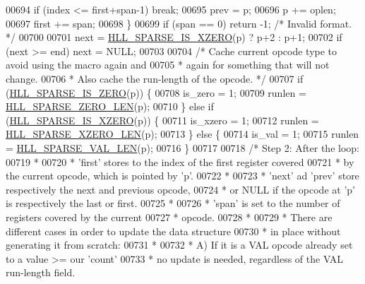 \begin{DoxyCode}
{{00694         \textcolor{keywordflow}{if} (index <= first+span-1) \textcolor{keywordflow}{break};
00695         prev = p;
00696         p += oplen;
00697         first += span;
00698     \}
00699     \textcolor{keywordflow}{if} (span == 0) \textcolor{keywordflow}{return} -1; \textcolor{comment}{/* Invalid format. */}
00700 
00701     next = \hyperlink{hyperloglog_8c_ac672e0af491e4cbfe7a5859ae4dc74f9}{HLL\_SPARSE\_IS\_XZERO}(p) ? p+2 : p+1;
00702     \textcolor{keywordflow}{if} (next >= end) next = NULL;
00703 
00704     \textcolor{comment}{/* Cache current opcode type to avoid using the macro again and}
00705 \textcolor{comment}{     * again for something that will not change.}
00706 \textcolor{comment}{     * Also cache the run-length of the opcode. */}
00707     \textcolor{keywordflow}{if} (\hyperlink{hyperloglog_8c_a0b65ae2290df116ae4ed18188dffb5ad}{HLL\_SPARSE\_IS\_ZERO}(p)) \{
00708         is\_zero = 1;
00709         runlen = \hyperlink{hyperloglog_8c_a0ed89a76f49a89991af87cce34c3260b}{HLL\_SPARSE\_ZERO\_LEN}(p);
00710     \} \textcolor{keywordflow}{else} \textcolor{keywordflow}{if} (\hyperlink{hyperloglog_8c_ac672e0af491e4cbfe7a5859ae4dc74f9}{HLL\_SPARSE\_IS\_XZERO}(p)) \{
00711         is\_xzero = 1;
00712         runlen = \hyperlink{hyperloglog_8c_a95fbeb27967ea46816fd354ddb59564e}{HLL\_SPARSE\_XZERO\_LEN}(p);
00713     \} \textcolor{keywordflow}{else} \{
00714         is\_val = 1;
00715         runlen = \hyperlink{hyperloglog_8c_a5c74b3b50c822c01c1976a72b84db12f}{HLL\_SPARSE\_VAL\_LEN}(p);
00716     \}
00717 
00718     \textcolor{comment}{/* Step 2: After the loop:}
00719 \textcolor{comment}{     *}
00720 \textcolor{comment}{     * 'first' stores to the index of the first register covered}
00721 \textcolor{comment}{     *  by the current opcode, which is pointed by 'p'.}
00722 \textcolor{comment}{     *}
00723 \textcolor{comment}{     * 'next' ad 'prev' store respectively the next and previous opcode,}
00724 \textcolor{comment}{     *  or NULL if the opcode at 'p' is respectively the last or first.}
00725 \textcolor{comment}{     *}
00726 \textcolor{comment}{     * 'span' is set to the number of registers covered by the current}
00727 \textcolor{comment}{     *  opcode.}
00728 \textcolor{comment}{     *}
00729 \textcolor{comment}{     * There are different cases in order to update the data structure}
00730 \textcolor{comment}{     * in place without generating it from scratch:}
00731 \textcolor{comment}{     *}
00732 \textcolor{comment}{     * A) If it is a VAL opcode already set to a value >= our 'count'}
00733 \textcolor{comment}{     *    no update is needed, regardless of the VAL run-length field.}
}}
\end{DoxyCode}
